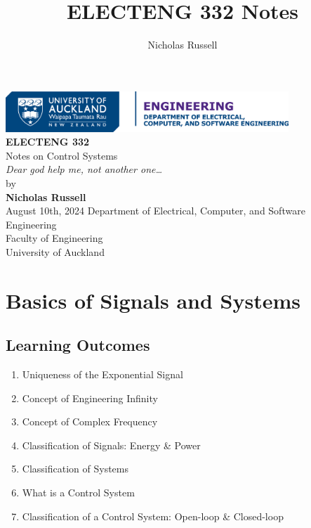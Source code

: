 \documentclass[
  12pt,
  a4paper,
]{report}
\title{ELECTENG 332 Notes}
\author{Nicholas Russell}
\author{}
\date{}
\renewcommand*\contentsname{Table of contents}
\newcommand\contentsname{Table of contents}
\begin{document}
\begin{titlepage}
    \centering
    \includegraphics[width=0.8\textwidth]{images/DECSE-HC-4C-01.png}\\[1cm]
    {\LARGE \textbf{ELECTENG 332}}\\[0.5cm]
    {\Large Notes on Control Systems}\\[0.5cm]
    {\textit{Dear god help me, not another one\dots\ }}\\[2cm]
    {\large by}\\[0.3cm]
    {\large \textbf{Nicholas Russell}}\\[1.4cm]
    {\large August 10th, 2024}
    \vfill
    {\large Department of Electrical, Computer, and Software Engineering}\\[0.3cm]
    {\large Faculty of Engineering}\\[0.3cm]
    {\large University of Auckland}
\end{titlepage}

\renewcommand*\contentsname{Table of contents}
{
\hypersetup{linkcolor=}
\setcounter{tocdepth}{3}
\tableofcontents
}

\chapter{Basics of Signals and
Systems}\label{basics-of-signals-and-systems}

\section*{Learning Outcomes}\label{learning-outcomes}

\begin{enumerate}[label=\(\blacktriangleright\), leftmargin=*, itemsep=0.5em]
    \item Uniqueness of the Exponential Signal
    \item Concept of Engineering Infinity
    \item Concept of Complex Frequency
    \item Classification of Signals: Energy \& Power
    \item Classification of Systems
    \item What is a Control System
    \item Classification of a Control System: Open-loop \& Closed-loop
\end{enumerate}
\end{document}
